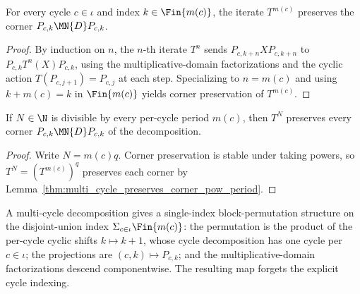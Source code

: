 \begin{lemma}
    \label{thm:multi_cycle_preserves_corner_pow_period}
    \leanok
    For every cycle $c\in\iota$ and index $k\in\Fin{m(c)}$, the
    iterate $T^{m(c)}$ preserves the corner $P_{c,k}\MN{D}P_{c,k}$.
\end{lemma}

\begin{proof}
    \leanok
    By induction on $n$, the $n$-th iterate $T^n$ sends
    $P_{c,k+n}XP_{c,k+n}$ to $P_{c,k}T^n(X)P_{c,k}$, using the
    multiplicative-domain factorizations and the cyclic action
    $T(P_{c,j+1})=P_{c,j}$ at each step. Specializing to $n=m(c)$ and using
    $k+m(c)=k$ in $\Fin{m(c)}$ yields corner preservation of $T^{m(c)}$.
\end{proof}

\begin{lemma}
    \label{thm:multi_cycle_preserves_corner_pow_of_dvd}
    \leanok
    If $N\in\N$ is divisible by every per-cycle period $m(c)$, then $T^N$
    preserves every corner $P_{c,k}\MN{D}P_{c,k}$ of the decomposition.
\end{lemma}

\begin{proof}
    \leanok
    Write $N=m(c)q$. Corner preservation is stable under taking powers, so
    $T^N=(T^{m(c)})^q$ preserves each corner by
    Lemma~\ref{thm:multi_cycle_preserves_corner_pow_period}.
\end{proof}

\begin{definition}
    \label{def:multi_cycle_to_cycle_structure}
    \leanok
    A multi-cycle decomposition gives a single-index block-permutation
    structure on the disjoint-union index
    $\Sigma_{c\in\iota}\Fin{m(c)}$: the permutation is the product of the
    per-cycle cyclic shifts $k\mapsto k+1$, whose cycle decomposition has
    one cycle per $c\in\iota$; the projections are
    $(c,k)\mapsto P_{c,k}$; and the multiplicative-domain factorizations
    descend componentwise. The resulting map forgets the explicit cycle
    indexing.
\end{definition}

